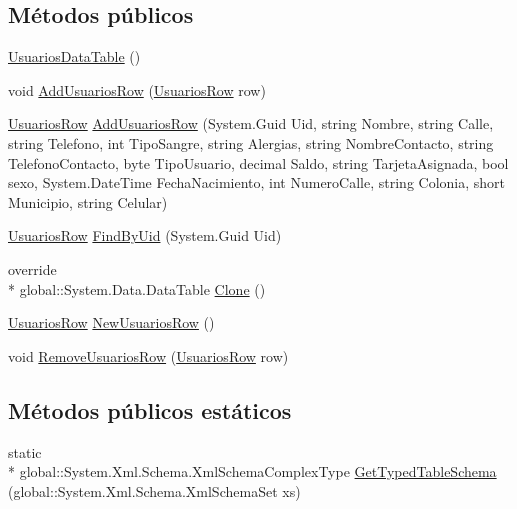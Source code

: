 \subsection*{Métodos públicos}
\begin{DoxyCompactItemize}
\item 
\hyperlink{class_proyecto___integrador__3_1_1ds_usuarios_1_1_usuarios_data_table_aaef6d7537bb6690b6e254b50e604db7a}{Usuarios\-Data\-Table} ()
\item 
void \hyperlink{class_proyecto___integrador__3_1_1ds_usuarios_1_1_usuarios_data_table_a5ef8027791b5ae1564a0dce426b8f135}{Add\-Usuarios\-Row} (\hyperlink{class_proyecto___integrador__3_1_1ds_usuarios_1_1_usuarios_row}{Usuarios\-Row} row)
\item 
\hyperlink{class_proyecto___integrador__3_1_1ds_usuarios_1_1_usuarios_row}{Usuarios\-Row} \hyperlink{class_proyecto___integrador__3_1_1ds_usuarios_1_1_usuarios_data_table_accafb6187830b00310b473efafd75e36}{Add\-Usuarios\-Row} (System.\-Guid Uid, string Nombre, string Calle, string Telefono, int Tipo\-Sangre, string Alergias, string Nombre\-Contacto, string Telefono\-Contacto, byte Tipo\-Usuario, decimal Saldo, string Tarjeta\-Asignada, bool sexo, System.\-Date\-Time Fecha\-Nacimiento, int Numero\-Calle, string Colonia, short Municipio, string Celular)
\item 
\hyperlink{class_proyecto___integrador__3_1_1ds_usuarios_1_1_usuarios_row}{Usuarios\-Row} \hyperlink{class_proyecto___integrador__3_1_1ds_usuarios_1_1_usuarios_data_table_a5ba08b370bc2f5d37395a616bc20604b}{Find\-By\-Uid} (System.\-Guid Uid)
\item 
override \\*
global\-::\-System.\-Data.\-Data\-Table \hyperlink{class_proyecto___integrador__3_1_1ds_usuarios_1_1_usuarios_data_table_ada7e994b8ce6352f4df60424baba12a1}{Clone} ()
\item 
\hyperlink{class_proyecto___integrador__3_1_1ds_usuarios_1_1_usuarios_row}{Usuarios\-Row} \hyperlink{class_proyecto___integrador__3_1_1ds_usuarios_1_1_usuarios_data_table_a70c32788626d9132796c32639fb80d2d}{New\-Usuarios\-Row} ()
\item 
void \hyperlink{class_proyecto___integrador__3_1_1ds_usuarios_1_1_usuarios_data_table_af45bb0984f6ff5a960de22743f65a897}{Remove\-Usuarios\-Row} (\hyperlink{class_proyecto___integrador__3_1_1ds_usuarios_1_1_usuarios_row}{Usuarios\-Row} row)
\end{DoxyCompactItemize}
\subsection*{Métodos públicos estáticos}
\begin{DoxyCompactItemize}
\item 
static \\*
global\-::\-System.\-Xml.\-Schema.\-Xml\-Schema\-Complex\-Type \hyperlink{class_proyecto___integrador__3_1_1ds_usuarios_1_1_usuarios_data_table_a4eb9bc8ebcb7cb7663c1fd873771ca6b}{Get\-Typed\-Table\-Schema} (global\-::\-System.\-Xml.\-Schema.\-Xml\-Schema\-Set xs)
\end{DoxyCompactItemize}
